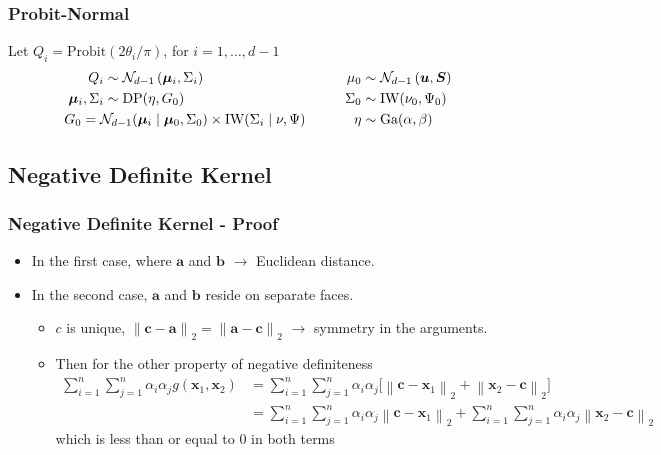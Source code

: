 \documentclass[aspectratio=169]{beamer}
\newcommand{\norm}[1]{\left\lVert #1 \right\rVert}
\newcommand{\pnorm}[2]{\norm{#1}_{#2}}
\begin{document}
\begin{frame}
  \frametitle{Probit-Normal}
  Let $Q_i = \text{Probit}(2\theta_i / \pi)$, for $i = 1,\ldots,d-1$
  \begin{equation*}
    \begin{aligned}
                Q_i &\sim \mathcal{N}_{d-1}\left(\bm{\mu}_i, \Sigma_i\right)\\
    \bm{\mu}_i, \Sigma_i &\sim \text{DP}(\eta, G_0)\\
                    &\hspace{-1cm}G_0 =
                      \mathcal{N}_{d-1}(\bm{\mu}_i\mid\bm{\mu}_0,\Sigma_0)\times \text{IW}(\Sigma_i\mid\nu,\Psi)
    \end{aligned}
    \hspace{1cm}
    \begin{aligned}
              \mu_0 &\sim \mathcal{N}_{d-1}\left(\bm{u},\bm{S}\right)\\
           \Sigma_0 &\sim \text{IW}(\nu_0,\Psi_0)\\
               \eta &\sim \text{Ga}(\alpha, \beta)
    \end{aligned}
  \end{equation*}
\end{frame}

\subsection*{Negative Definite Kernel}
\begin{frame}
    \frametitle{Negative Definite Kernel - Proof}
    \begin{itemize}
        \item In the first case, where $\bm{a}$ and $\bm{b}$ $\rightarrow$ Euclidean distance. 
        \item In the second case, $\bm{a}$ and $\bm{b}$ reside on separate
  faces.  
  \begin{itemize}
      \item $c$ is unique, $\pnorm{\bm{c} - \bm{a}}{2} = \pnorm{\bm{a} - \bm{c}}{2}$ $\rightarrow$ symmetry in the arguments.
      \item Then for the other property of negative definiteness
  \begin{equation*}
    \begin{aligned}
      \sum_{i = 1}^n\sum_{j = 1}^n \alpha_i\alpha_j g(\bm{x}_1,\bm{x}_2) &= \sum_{i = 1}^n\sum_{j = 1}^n \alpha_i\alpha_j \bigg[\pnorm{\bm{c} - \bm{x}_1}{2} + \pnorm{\bm{x}_2 - \bm{c}}{2}\bigg]\\
      &= \sum_{i = 1}^n\sum_{j = 1}^n \alpha_i\alpha_j\pnorm{\bm{c} - \bm{x}_1}{2} + \sum_{i = 1}^n\sum_{j = 1}^n \alpha_i\alpha_j\pnorm{\bm{x}_2 - \bm{c}}{2}
    \end{aligned}
  \end{equation*}
  which is less than or equal to $0$ in both terms
  \end{itemize} 
  \end{itemize}
\end{frame}
\end{document}
